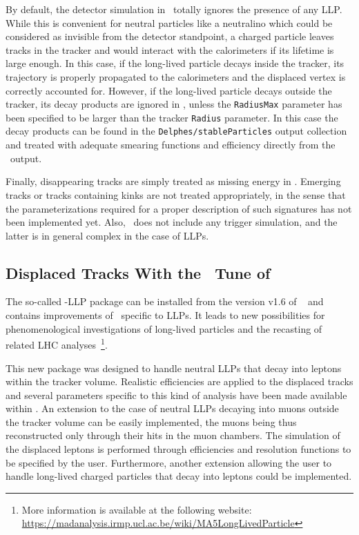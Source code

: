 By default, the detector simulation in \DEL\ totally ignores the presence of any
LLP. While this is convenient for neutral particles like a
neutralino which could be considered as invisible from the detector standpoint,
a charged particle leaves tracks in the tracker and would interact with the
calorimeters if its lifetime is large enough.
In this case, if the long-lived particle decays inside the tracker, its
trajectory is properly propagated to the calorimeters and the displaced vertex
is correctly accounted for. However, if the long-lived particle decays outside
the tracker, its decay products are ignored in \DEL, unless the \verb+RadiusMax+
parameter has been specified to be larger than the tracker \verb+Radius+
parameter. In this case the decay products can be found in the
\verb+Delphes/stableParticles+ output collection and
treated with adequate smearing functions and efficiency directly from the \DEL\
output.

Finally, disappearing tracks are simply treated as missing energy in \DEL. Emerging tracks or tracks containing kinks are not treated appropriately, in the sense that the parameterizations required for a proper description of such signatures has not been implemented yet. Also, \DEL\ does not include any trigger simulation, and the latter is in general complex in the case of LLPs.

\subsection{Displaced Tracks With the \MA\ Tune of \DEL}

The so-called \DEL-LLP package can be installed from the version v1.6 of
\MA~\cite{Conte:2012fm,Conte:2014zja} and contains improvements of \DEL\
specific to LLPs. It leads to new possibilities for phenomenological investigations of long-lived
particles and the recasting of related LHC analyses~\footnote{More information is
available at the following website:\\ \noindent \url{https://madanalysis.irmp.ucl.ac.be/wiki/MA5LongLivedParticle}}.

This new package was designed to handle neutral LLPs that decay
into leptons within the tracker volume. Realistic efficiencies are applied to
the displaced tracks and several parameters specific to this kind of analysis
have been made available within \MA. An extension to the case of neutral
LLPs decaying into muons outside the tracker volume can be easily
implemented, the muons being thus reconstructed only through their hits in the
muon chambers. The simulation of the displaced leptons is performed through efficiencies and resolution functions to be specified by the user. Furthermore, another
extension allowing the user to handle long-lived charged particles that decay into
leptons could be implemented.

